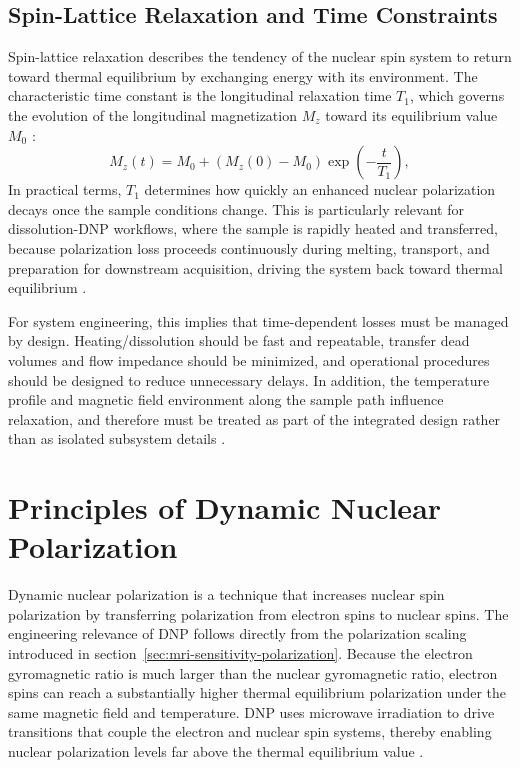 \documentclass[FM,DP,EN,twoside]{tulthesis}
\begin{document}
\subsection{Spin-Lattice Relaxation and Time Constraints}
\label{subsec:relaxation-time-constraints}
Spin-lattice relaxation describes the tendency of the nuclear spin system to return toward thermal equilibrium by exchanging energy with its environment. The characteristic time constant is the longitudinal relaxation time $T_1$, which governs the evolution of the longitudinal magnetization $M_z$ toward its equilibrium value $M_0$ \cite{relaxation_ref}:
\begin{equation}
M_z(t) = M_0 + \left(M_z(0) - M_0\right)\exp\!\left(-\frac{t}{T_1}\right),
\label{eq:t1-recovery}
\end{equation}
In practical terms, $T_1$ determines how quickly an enhanced nuclear polarization decays once the sample conditions change. This is particularly relevant for dissolution-DNP workflows, where the sample is rapidly heated and transferred, because polarization loss proceeds continuously during melting, transport, and preparation for downstream acquisition, driving the system back toward thermal equilibrium \cite{dissolution_dnp_workflow_ref}.

For system engineering, this implies that time-dependent losses must be managed by design. Heating/dissolution should be fast and repeatable, transfer dead volumes and flow impedance should be minimized, and operational procedures should be designed to reduce unnecessary delays. In addition, the temperature profile and magnetic field environment along the sample path influence relaxation, and therefore must be treated as part of the integrated design rather than as isolated subsystem details \cite{hyperpolarized_transfer_constraints_ref}.



\section{Principles of Dynamic Nuclear Polarization}
\label{sec:principles-of-dnp}
Dynamic nuclear polarization is a technique that increases nuclear spin polarization by transferring polarization from electron spins to nuclear spins. The engineering relevance of DNP follows directly from the polarization scaling introduced in section~\ref{sec:mri-sensitivity-polarization}. Because the electron gyromagnetic ratio is much larger than the nuclear gyromagnetic ratio, electron spins can reach a substantially higher thermal equilibrium polarization under the same magnetic field and temperature. DNP uses microwave irradiation to drive transitions that couple the electron and nuclear spin systems, thereby enabling nuclear polarization levels far above the thermal equilibrium value \cite{DNP_fundamentals_ref}.
\end{document}
